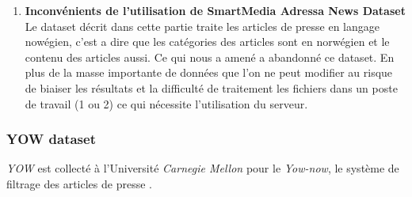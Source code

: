 \begin{enumerate}[leftmargin=*]
        \item\textbf{Inconvénients de l'utilisation de \textquotedbl SmartMedia Adressa News Dataset\textquotedbl}\\
        Le dataset décrit dans cette partie traite les articles de presse en langage nowégien, c'est a dire que les catégories des articles sont en norwégien et le contenu des articles aussi. Ce qui nous a amené a abandonné ce dataset. En plus de la masse importante de données que l'on ne peut modifier au risque de biaiser les résultats et la difficulté de traitement les fichiers dans un poste de travail (1 ou 2) ce qui nécessite l'utilisation du serveur.\\
    \end{enumerate}

    \subsubsection{\textquotedbl YOW \textquotedbl dataset }
    \emph{YOW} est collecté à l'Université \emph{Carnegie Mellon} pour le \emph{Yow-now}, le système de filtrage des articles de presse \cite{carnegieYOW}.

